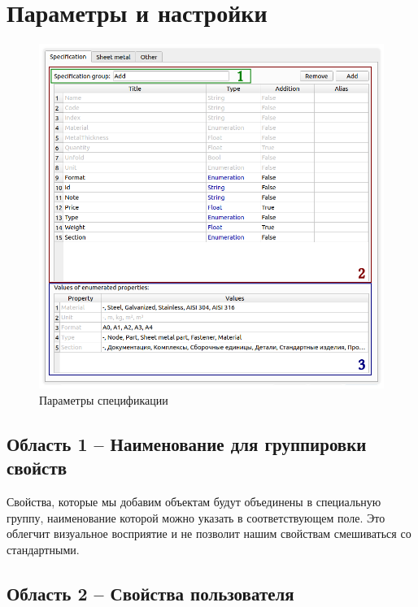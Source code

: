 \documentclass[a4paper,12pt]{article}
\begin{document}
\pagebreak




\section{Параметры и настройки}

\begin{figure}[htp]
	\centering
	\includegraphics[width=1\textwidth]{img/pref_specification.png}
	\caption{Параметры спецификации}
	\label{sec:pref_specification}
\end{figure}

\subsection{Область 1 -- Наименование для группировки свойств}
Свойства, которые мы добавим объектам будут объединены в специальную группу, наименование которой можно указать в соответствующем поле. Это облегчит визуальное восприятие и не позволит нашим свойствам смешиваться со стандартными.


\pagebreak


\subsection{Область 2 -- Свойства пользователя}
\end{document}
